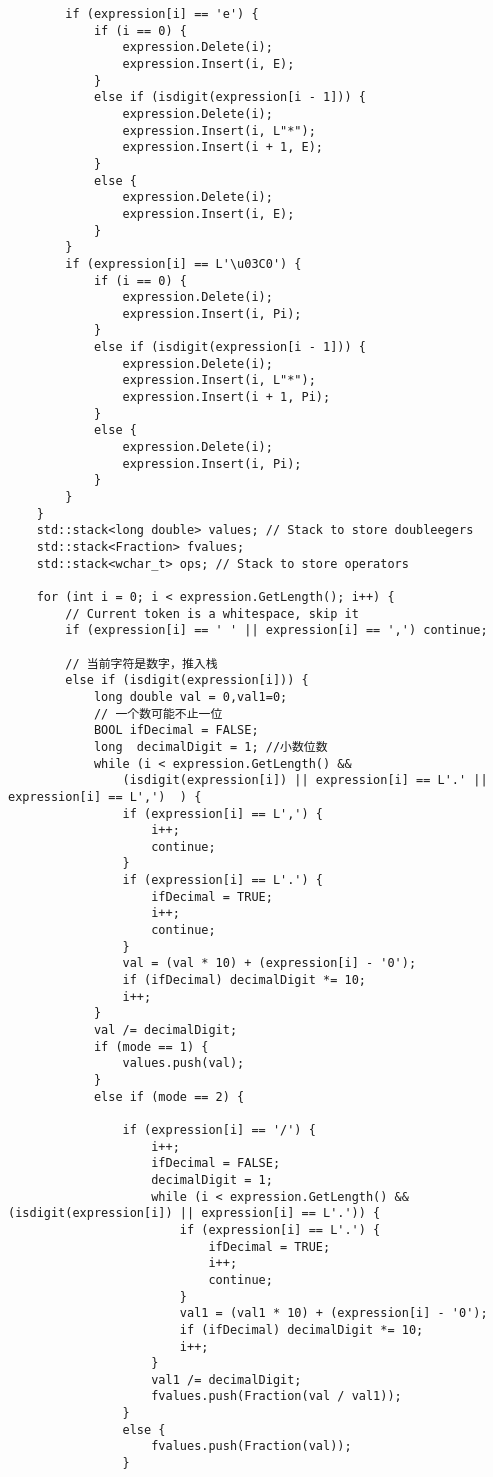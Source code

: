 \begin{lstlisting}
        if (expression[i] == 'e') {
            if (i == 0) {
                expression.Delete(i);
                expression.Insert(i, E);
            }
            else if (isdigit(expression[i - 1])) {
                expression.Delete(i);
                expression.Insert(i, L"*");
                expression.Insert(i + 1, E);
            }
            else {
                expression.Delete(i);
                expression.Insert(i, E);
            }
        }
        if (expression[i] == L'\u03C0') {
            if (i == 0) {
                expression.Delete(i);
                expression.Insert(i, Pi);
            }
            else if (isdigit(expression[i - 1])) {
                expression.Delete(i);
                expression.Insert(i, L"*");
                expression.Insert(i + 1, Pi);
            }
            else {
                expression.Delete(i);
                expression.Insert(i, Pi);
            }
        }
    }
    std::stack<long double> values; // Stack to store doubleegers
    std::stack<Fraction> fvalues;
    std::stack<wchar_t> ops; // Stack to store operators

    for (int i = 0; i < expression.GetLength(); i++) {
        // Current token is a whitespace, skip it
        if (expression[i] == ' ' || expression[i] == ',') continue;

        // 当前字符是数字，推入栈
        else if (isdigit(expression[i])) {
            long double val = 0,val1=0;
            // 一个数可能不止一位
            BOOL ifDecimal = FALSE;
            long  decimalDigit = 1; //小数位数
            while (i < expression.GetLength() && 
                (isdigit(expression[i]) || expression[i] == L'.' || expression[i] == L',')  ) {
                if (expression[i] == L',') {
                    i++;
                    continue;
                }
                if (expression[i] == L'.') {
                    ifDecimal = TRUE;
                    i++;
                    continue;
                }
                val = (val * 10) + (expression[i] - '0');
                if (ifDecimal) decimalDigit *= 10;
                i++;
            }
            val /= decimalDigit;
            if (mode == 1) {
                values.push(val);
            }
            else if (mode == 2) {

                if (expression[i] == '/') { 
                    i++;
                    ifDecimal = FALSE;
                    decimalDigit = 1; 
                    while (i < expression.GetLength() && (isdigit(expression[i]) || expression[i] == L'.')) {
                        if (expression[i] == L'.') {
                            ifDecimal = TRUE;
                            i++;
                            continue;
                        }
                        val1 = (val1 * 10) + (expression[i] - '0');
                        if (ifDecimal) decimalDigit *= 10;
                        i++;
                    }
                    val1 /= decimalDigit;
                    fvalues.push(Fraction(val / val1));
                }
                else {
                    fvalues.push(Fraction(val));
                }
            

\end{lstlisting}
